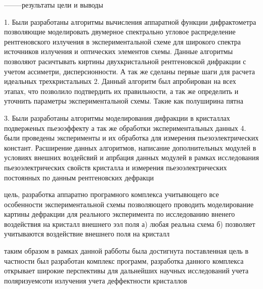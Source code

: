 
--------результаты
цели и выводы

1. Были разработаны алгоритмы вычисления аппаратной функции дифрактометра позволяющие моделировать
двумерное спектрально угловое распределение рентгеновского излучения в экспериментальной схеме
для широкого спектра источников излучения и оптических элементов схемы. Данные алгоритмы позволяют расичтывать
киртины двухкристальной рентгеновской дифракции с учетом ассиметри, дисперсионности. А так же сделаны первые шаги
для расчета идеальных трехкристальных
2. Данный алгоритм был апробирован на всех этапах, что позволило подтвердить их правильности,
а так же определить и уточнить параметры экспериментальной схемы. Такие как полуширина пятна

3. Были разработаны алгоритмы моделирования дифракции в кристаллах подверженых пьезоэффекту а так же обработки
экспериментальных данных
4. были проведены эксперименты и их обработка для измерения пьезоэлектрических констант.
Расширение данных алгоритмов, написание дополнительных модулей в условиях внешних воздейсвий
и апрбация данных модулей в рамках исследования пьезоэлектрических свойств кристалла и
измерения пьезоэлектрических постоянных по данным рентгеновских дефракци



цель, разработка аппаратно програмного комплекса учитывющего все особенности экспериментальной схемы
позволяющего проводить моделирование картины дефракции для реального эксперимента
по исследованию вненего воздействия на кристалл внешнего ээл поля
а) любая реальна схема
б) позволяет учитываются воздействие внешнего поля на кристалл



таким образом в рамках данной рабботы была достигнута поставленная цель
в частности был разработан комплекс программ,
разработка данного комплекса открывает широкие перспективы для дальнейших
научных исследований
учета поляризуемсоти излучения учета деффектности кристаллов
